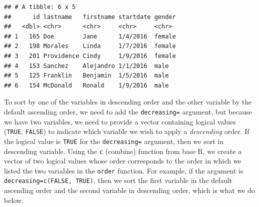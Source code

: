 \documentclass[]{book}
\newenvironment{Shaded}{\begin{snugshade}}{\end{snugshade}}
\newcommand{\KeywordTok}[1]{\textcolor[rgb]{0.13,0.29,0.53}{\textbf{#1}}}
\newcommand{\DataTypeTok}[1]{\textcolor[rgb]{0.13,0.29,0.53}{#1}}
\newcommand{\StringTok}[1]{\textcolor[rgb]{0.31,0.60,0.02}{#1}}
\newcommand{\CommentTok}[1]{\textcolor[rgb]{0.56,0.35,0.01}{\textit{#1}}}
\newcommand{\OtherTok}[1]{\textcolor[rgb]{0.56,0.35,0.01}{#1}}
\newcommand{\OperatorTok}[1]{\textcolor[rgb]{0.81,0.36,0.00}{\textbf{#1}}}
\newcommand{\NormalTok}[1]{#1}
\begin{document}
\begin{Shaded}
\end{Shaded}

\begin{verbatim}
## # A tibble: 6 x 5
##      id lastname   firstname startdate gender
##   <dbl> <chr>      <chr>     <chr>     <chr> 
## 1   165 Doe        Jane      1/4/2016  female
## 2   198 Morales    Linda     1/7/2016  female
## 3   201 Providence Cindy     1/9/2016  female
## 4   153 Sanchez    Alejandro 1/1/2016  male  
## 5   125 Franklin   Benjamin  1/5/2016  male  
## 6   154 McDonald   Ronald    1/9/2016  male
\end{verbatim}

To sort by one of the variables in descending order and the other
variable by the default ascending order, we need to add the
\texttt{decreasing=} argument, but because we have two variables, we
need to provide a vector containing logical values (\texttt{TRUE},
\texttt{FALSE}) to indicate which variable we wish to apply a
\emph{descending} order. If the logical value is \texttt{TRUE} for the
\texttt{decreasing=} argument, then we sort in descending variable.
Using the \texttt{c} (combine) function from base R, we create a vector
of two logical values whose order corresponds to the order in which we
listed the two variables in the \texttt{order} function. For example, if
the argument is \texttt{decreasing=c(FALSE,\ TRUE)}, then we sort the
first variable in the default ascending order and the second variable in
descending order, which is what we do below.

\begin{Shaded}
\end{Shaded}
\end{document}
